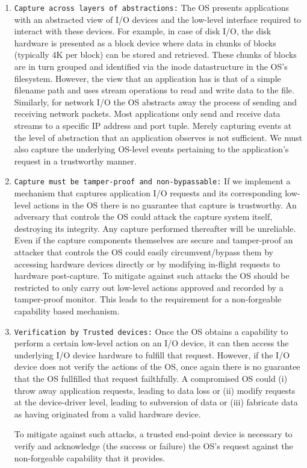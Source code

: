 \documentclass[withindex,glossary]{cam-thesis}
\begin{document}
\begin{enumerate}

\item \texttt{Capture across layers of abstractions:}
The OS presents applications with an abstracted view of I/O devices and the low-level interface required to interact with these devices.
For example, in case of disk I/O, the disk hardware is presented as a block device where data in chunks of blocks (typically 4K per block) can be stored and retrieved.
These chunks of blocks are in turn grouped and identified via the inode datastructure in the OS's filesystem.
However, the view that an application has is that of a simple filename path and uses stream operations to read and write data to the file.
Similarly, for network I/O the OS abstracts away the process of sending and receiving network packets.
Most applications only send and receive data streams to a specific IP address and port tuple.
Merely capturing events at the level of abstraction that an application observes is not sufficient.
We must also capture the underlying OS-level events pertaining to the application's request in a trustworthy manner.

\item \texttt{Capture must be tamper-proof and non-bypassable:}
If we implement a mechanism that captures application I/O requests and its corresponding low-level actions in the OS there is no guarantee that capture is trustworthy.
An adversary that controls the OS could attack the capture system itself, destroying its integrity.
Any capture performed thereafter will be unreliable.
Even if the capture components themselves are secure and tamper-proof an attacker that controls the OS could easily circumvent/bypass them by accessing hardware devices directly or by modifying in-flight requests to hardware post-capture.
To mitigate against such attacks the OS should be restricted to only carry out low-level actions approved and recorded by a tamper-proof monitor.
This leads to the requirement for a non-forgeable capability based mechanism.

\item \texttt{Verification by Trusted devices:}
Once the OS obtains a capability to perform a certain low-level action on an I/O device, it can then access the underlying I/O device hardware to fulfill that request.
However, if the I/O device does not verify the actions of the OS, once again there is no guarantee that the OS fullfilled that request failthfully.
A compromised OS could (i) throw away application requests, leading to data loss or
(ii) modify requests at the device-driver level, leading to subversion of data or
(iii) fabricate data as having originated from a valid hardware device.

To mitigate against such attacks, a trusted end-point device is necessary to verify and acknowledge (the success or failure) the OS's request against the non-forgeable capability that it provides.

\end{enumerate}
\end{document}
